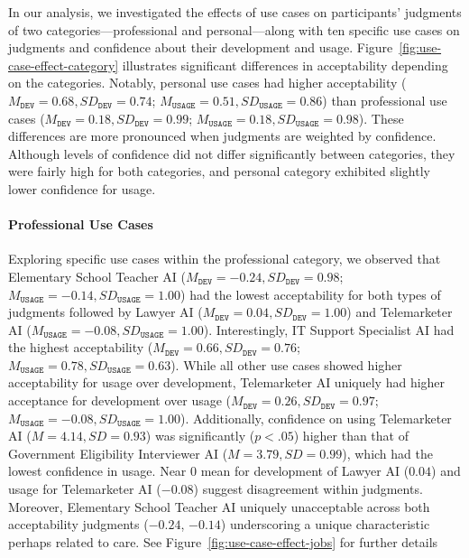 In our analysis, we investigated the effects of use cases on participants' judgments of two categories—professional and personal—along with ten specific use cases on judgments and confidence about their development and usage. Figure~\ref{fig:use-case-effect-category} illustrates significant differences in acceptability depending on the categories. Notably, personal use cases had higher acceptability ($M_{\texttt{DEV}}=0.68, SD_{\texttt{DEV}}=0.74$; $M_{\texttt{USAGE}}=0.51, SD_{\texttt{USAGE}}=0.86$) than professional use cases ($M_{\texttt{DEV}}=0.18, SD_{\texttt{DEV}}=0.99$; $M_{\texttt{USAGE}}=0.18, SD_{\texttt{USAGE}}=0.98$). These differences are more pronounced when judgments are weighted by confidence. Although levels of confidence did not differ significantly between categories, they were fairly high for both categories, and personal category exhibited slightly lower confidence for usage. 

% 

\paragraph{Professional Use Cases}
Exploring specific use cases within the professional category, we observed that Elementary School Teacher AI ($M_{\texttt{DEV}}=-0.24, SD_{\texttt{DEV}}=0.98$; $M_{\texttt{USAGE}}=-0.14, SD_{\texttt{USAGE}}=1.00$) had the lowest acceptability for both types of judgments followed by Lawyer AI ($M_{\texttt{DEV}}=0.04, SD_{\texttt{DEV}}=1.00$) and Telemarketer AI ($M_{\texttt{USAGE}}=-0.08, SD_{\texttt{USAGE}}=1.00$). Interestingly, IT Support Specialist AI had the highest acceptability ($M_{\texttt{DEV}}=0.66, SD_{\texttt{DEV}}=0.76$; $M_{\texttt{USAGE}}=0.78, SD_{\texttt{USAGE}}=0.63$). 
While all other use cases showed higher acceptability for usage over development, Telemarketer AI uniquely had higher acceptance for development over usage ($M_{\texttt{DEV}}=0.26, SD_{\texttt{DEV}}=0.97$; $M_{\texttt{USAGE}}=-0.08, SD_{\texttt{USAGE}}=1.00$). Additionally, confidence on using Telemarketer AI ($M=4.14, SD=0.93$) was significantly ($p<.05$) higher than that of Government Eligibility Interviewer AI ($M=3.79, SD=0.99$), which had the lowest confidence in usage. Near 0 mean for development of Lawyer AI ($0.04$) and usage for Telemarketer AI ($-0.08$) suggest disagreement within judgments. Moreover, Elementary School Teacher AI uniquely unacceptable across both acceptability judgments ($-0.24$, $-0.14$) underscoring a unique characteristic perhaps related to care. See Figure~\ref{fig:use-case-effect-jobs} for further details


